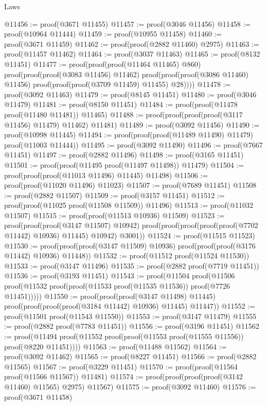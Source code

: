 \begin{lexlean}{Laws}
\begin{coremodule}
@11456 := proof(@3671 @11455)
@11457 := proof(@3046 @11456)
@11458 := proof(@10964 @11444)
@11459 := proof(@10955 @11458)
@11460 := proof(@3671 @11459)
@11462 := proof(proof(@2882 @11460) @2975)
@11463 := proof(@11457 @11462)
@11464 := proof(@3037 @11463)
@11465 := proof(@8132 @11451)
@11477 := proof(proof(proof(@11464 @11465) @860)
      proof(proof(proof(@3083 @11456) @11462)
          proof(proof(proof(@3086 @11460) @11456) proof(proof(proof(@3709 @11459) @11455) @28))))
@11478 := proof(@3092 @11463)
@11479 := proof(@8145 @11451)
@11480 := proof(@3046 @11479)
@11481 := proof(@8150 @11451)
@11484 := proof(proof(@11478 proof(@11480 @11481)) @11465)
@11488 := proof(proof(proof(proof(@3117 @11456) @11479) @11462) @11481)
@11489 := proof(@3092 @11456)
@11490 := proof(@10998 @11445)
@11494 := proof(proof(proof(@11489 @11490) @11479) proof(@11003 @11444))
@11495 := proof(@3092 @11490)
@11496 := proof(@7667 @11451)
@11497 := proof(@2882 @11496)
@11498 := proof(@3165 @11451)
@11501 := proof(proof(@11495 proof(@11497 @11498)) @11479)
@11504 := proof(proof(proof(@11013 @11496) @11445) @11498)
@11506 := proof(proof(@11020 @11496) @11023)
@11507 := proof(@7689 @11451)
@11508 := proof(@2882 @11507)
@11509 := proof(@3157 @11451)
@11512 := proof(proof(@11025 proof(@11508 @11509)) @11496)
@11513 := proof(@11032 @11507)
@11515 := proof(proof(@11513 @10936) @11509)
@11523 := proof(proof(proof(@3147 @11507) @10942)
      proof(proof(proof(proof(proof(@7702 @11442) @10936) @11445) @10942) @3001))
@11524 := proof(@11515 @11523)
@11530 := proof(proof(proof(@3147 @11509) @10936) proof(proof(proof(@3176 @11442) @10936) @11448))
@11532 := proof(@11512 proof(@11524 @11530))
@11533 := proof(@3147 @11496)
@11535 := proof(@2882 proof(@7719 @11451))
@11536 := proof(@3193 @11451)
@11543 := proof(@11504
      proof(@11506 proof(@11532 proof(proof(@11533 proof(@11535 @11536)) proof(@7726 @11451)))))
@11550 := proof(proof(proof(@3147 @11498) @11445)
      proof(proof(proof(proof(@3184 @11442) @10936) @11445) @11447))
@11552 := proof(@11501 proof(@11543 @11550))
@11553 := proof(@3147 @11479)
@11555 := proof(@2882 proof(@7783 @11451))
@11556 := proof(@3196 @11451)
@11562 := proof(@11494 proof(@11552 proof(proof(@11553 proof(@11555 @11556)) proof(@8220 @11451))))
@11563 := proof(@11488 @11562)
@11564 := proof(@3092 @11462)
@11565 := proof(@8227 @11451)
@11566 := proof(@2882 @11565)
@11567 := proof(@3229 @11451)
@11570 := proof(proof(@11564 proof(@11566 @11567)) @11481)
@11574 := proof(proof(proof(proof(@3142 @11460) @11565) @2975) @11567)
@11575 := proof(@3092 @11460)
@11576 := proof(@3671 @11458)

\end{coremodule}
\end{lexlean}
